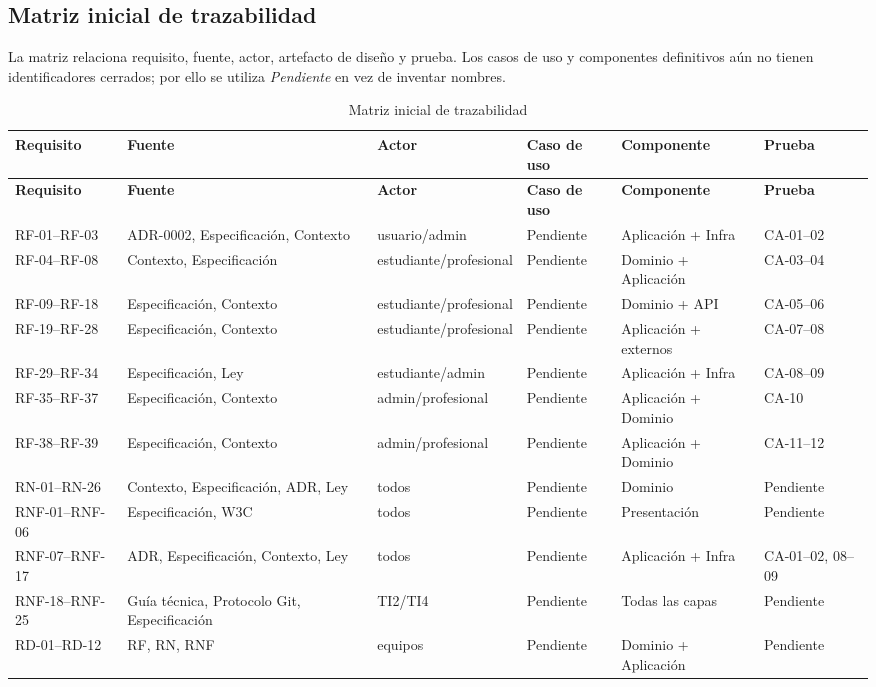 \documentclass[10pt,a4paper,oneside]{article}
\begin{document}
\subsection{Matriz inicial de trazabilidad}

La matriz relaciona requisito, fuente, actor, artefacto de diseño y prueba. Los casos de uso y componentes definitivos aún no tienen identificadores cerrados; por ello se utiliza \textit{Pendiente} en vez de inventar nombres.

\scriptsize
\begin{longtable}{@{}L{0.13\textwidth}L{0.14\textwidth}L{0.18\textwidth}L{0.16\textwidth}L{0.18\textwidth}L{0.10\textwidth}@{}}
\caption{Matriz inicial de trazabilidad}\label{tab:traz-sintesis}\\
\toprule\textbf{Requisito} & \textbf{Fuente} & \textbf{Actor} & \textbf{Caso de uso} & \textbf{Componente} & \textbf{Prueba}\\\midrule
\endfirsthead\toprule\textbf{Requisito} & \textbf{Fuente} & \textbf{Actor} & \textbf{Caso de uso} & \textbf{Componente} & \textbf{Prueba}\\\midrule\endhead
\bottomrule\endfoot
RF-01--RF-03 & ADR-0002, Especificación, Contexto & usuario/admin & Pendiente & Aplicación + Infra & CA-01--02\\
RF-04--RF-08 & Contexto, Especificación & estudiante/profesional & Pendiente & Dominio + Aplicación & CA-03--04\\
RF-09--RF-18 & Especificación, Contexto & estudiante/profesional & Pendiente & Dominio + API & CA-05--06\\
RF-19--RF-28 & Especificación, Contexto & estudiante/profesional & Pendiente & Aplicación + externos & CA-07--08\\
RF-29--RF-34 & Especificación, Ley & estudiante/admin & Pendiente & Aplicación + Infra & CA-08--09\\
RF-35--RF-37 & Especificación, Contexto & admin/profesional & Pendiente & Aplicación + Dominio & CA-10\\
RF-38--RF-39 & Especificación, Contexto & admin/profesional & Pendiente & Aplicación + Dominio & CA-11--12\\
RN-01--RN-26 & Contexto, Especificación, ADR, Ley & todos & Pendiente & Dominio & Pendiente\\
RNF-01--RNF-06 & Especificación, W3C & todos & Pendiente & Presentación & Pendiente\\
RNF-07--RNF-17 & ADR, Especificación, Contexto, Ley & todos & Pendiente & Aplicación + Infra & CA-01--02, 08--09\\
RNF-18--RNF-25 & Guía técnica, Protocolo Git, Especificación & TI2/TI4 & Pendiente & Todas las capas & Pendiente\\
RD-01--RD-12 & RF, RN, RNF & equipos & Pendiente & Dominio + Aplicación & Pendiente\\
\end{longtable}
\normalsize
\end{document}
